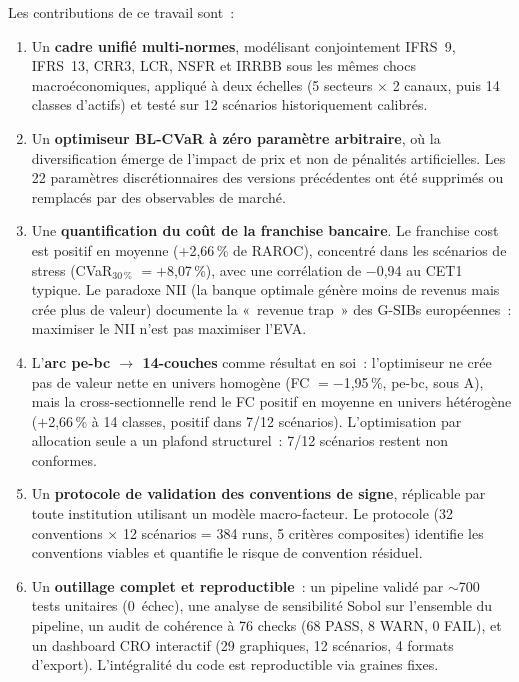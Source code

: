 \documentclass[10pt, a4paper, oneside]{report}
\theoremstyle{definition}
\begin{document}
Les contributions de ce travail sont~:

\begin{enumerate}
\item Un \textbf{cadre unifié multi-normes}, modélisant conjointement IFRS~9, IFRS~13, CRR3, LCR, NSFR et IRRBB sous les mêmes chocs macroéconomiques, appliqué à deux échelles (5 secteurs $\times$ 2 canaux, puis 14 classes d'actifs) et testé sur 12 scénarios historiquement calibrés.

\item Un \textbf{optimiseur BL-CVaR à zéro paramètre arbitraire}, où la diversification émerge de l'impact de prix \citep{kyle1985} et non de pénalités artificielles. Les 22 paramètres discrétionnaires des versions précédentes ont été supprimés ou remplacés par des observables de marché.

\item Une \textbf{quantification du coût de la franchise bancaire}. Le franchise cost est positif en moyenne ($+$2{,}66\,\% de RAROC), concentré dans les scénarios de stress (CVaR$_{30\,\%}$ $= +$8{,}07\,\%), avec une corrélation de $-$0{,}94 au CET1 typique. Le paradoxe NII (la banque optimale génère moins de revenus mais crée plus de valeur) documente la «~revenue trap~» des G-SIBs européennes~: maximiser le NII n'est pas maximiser l'EVA.

\item L'\textbf{arc pe-bc $\to$ 14-couches} comme résultat en soi~: l'optimiseur ne crée pas de valeur nette en univers homogène (FC $= -$1{,}95\,\%, pe-bc, sous A), mais la cross-sectionnelle rend le FC positif en moyenne en univers hétérogène ($+$2{,}66\,\% à 14 classes, positif dans 7/12 scénarios). L'optimisation par allocation seule a un plafond structurel~: 7/12 scénarios restent non conformes.

\item Un \textbf{protocole de validation des conventions de signe}, réplicable par toute institution utilisant un modèle macro-facteur. Le protocole (32 conventions $\times$ 12 scénarios = 384 runs, 5 critères composites) identifie les conventions viables et quantifie le risque de convention résiduel.

\item Un \textbf{outillage complet et reproductible}~: un pipeline validé par $\sim$700 tests unitaires (0~échec), une analyse de sensibilité Sobol sur l'ensemble du pipeline, un audit de cohérence à 76 checks (68 PASS, 8 WARN, 0 FAIL), et un dashboard CRO interactif (29 graphiques, 12 scénarios, 4 formats d'export). L'intégralité du code est reproductible via graines fixes.
\end{enumerate}
\end{document}
